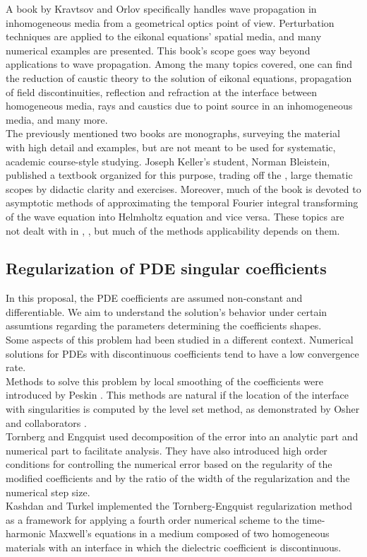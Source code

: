 \documentclass[12pt,twoside]{report}
\begin{document}
A book by Kravtsov and Orlov \cite{KravstovOrlov1990} specifically handles wave propagation in inhomogeneous media from a geometrical optics point of view. Perturbation techniques are applied to the eikonal equations' spatial media, and many numerical examples are presented. This book's scope goes way beyond applications to wave propagation. Among the many topics covered, one can find the reduction of caustic theory to the solution of eikonal equations, propagation of field discontinuities, reflection and refraction at the interface between homogeneous media, rays and caustics due to point source in an inhomogeneous media, and many more.\\

The  previously mentioned two books are monographs, surveying the material with high detail and examples, but are not meant to be used for systematic, academic course-style studying. Joseph Keller's student, Norman Bleistein, published a textbook \cite{Bleistein1984} organized for this purpose, trading off the \cite{KellerSurvey1995}, \cite{KravstovOrlov1990} large thematic scopes by didactic clarity and exercises. Moreover, much of the book is devoted to asymptotic methods of approximating the temporal Fourier integral transforming of the wave equation into Helmholtz equation and vice versa. These topics are not dealt with in \cite{KellerSurvey1995}, \cite{KravstovOrlov1990}, but much of the methods applicability depends on them.


\subsection{Regularization of PDE singular coefficients}
In this proposal, the PDE coefficients are assumed non-constant and differentiable. We aim to understand the solution's behavior under certain assumtions regarding the parameters determining the coefficients shapes.\\
Some aspects of this problem had been studied in a different context. Numerical solutions for PDEs with discontinuous  coefficients tend to have a low convergence rate. \\
Methods to solve this problem by local smoothing of the coefficients were introduced by Peskin \cite{Peskin1977, Peskin2002}. This methods are natural if the location of the interface with singularities is computed by the level set method, as demonstrated by Osher and collaborators \cite{SussmanOsher1994}.  \\ 
Tornberg and Engquist \cite{TornbegEngquist2003} used decomposition of the error into an analytic part and numerical part to facilitate analysis. They have also introduced high order conditions for controlling the numerical error based on the regularity of the modified coefficients and by the ratio of the width of the regularization and the numerical step size.\\ 
Kashdan and Turkel \cite{KashdanTurkel2006} implemented the Tornberg-Engquist regularization method as a framework for applying a fourth order numerical scheme to the time-harmonic Maxwell's equations in a medium composed of two homogeneous materials with an interface in which the dielectric coefficient is discontinuous.   
\end{document}
